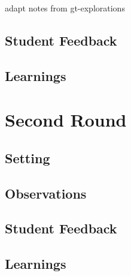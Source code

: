\begin{todo}
\item adapt notes from gt-explorations
\end{todo}

\subsection{Student Feedback}
\subsection{Learnings}

\section{Second Round} \label{sc_validation_compiler}
\subsection{Setting}
\subsection{Observations}
\subsection{Student Feedback}
\subsection{Learnings}
